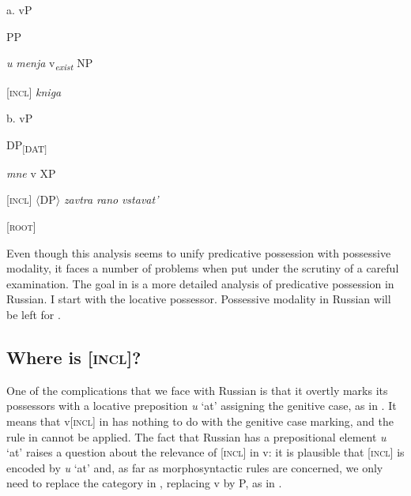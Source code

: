\documentclass[output=paper,colorlinks,citecolor=brown]{./langscibook}
\begin{document}
\ea%
    \label{ex:tsedryk:7}
    \gll\\
        \\
    \glt
    \z

          a.  vP    


  

    PP  

    \textit{u} \textit{menja}  v\textit{\textsubscript{exist}}   NP 

      [\textsc{incl}]  \textit{kniga}

  b.  vP    


  

    DP\textsubscript{[DAT]}  

    \textit{mne}  v    XP

      [\textsc{incl}]  ${\langle}$DP${\rangle}$ \textit{zavtra} \textit{rano} \textit{vstavat’}

      [\textsc{root}]  

Even though this analysis seems to unify predicative possession with possessive modality, it faces a number of problems when put under the scrutiny of a careful examination. The goal in  is a more detailed analysis of predicative possession in Russian. I start with the locative possessor. Possessive modality in Russian will be left for .

\subsection{Where is [\textsc{incl}]?}\label{sec:tsedryk:2.2}

One of the complications that we face with Russian is that it overtly marks its possessors with a locative preposition \textit{u} ‘at’ assigning the genitive case, as in . It means that v[\textsc{incl}] in  has nothing to do with the genitive case marking, and the rule in  cannot be applied. The fact that Russian has a prepositional element \textit{u} ‘at’ raises a question about the relevance of [\textsc{incl}] in v: it is plausible that [\textsc{incl}] is encoded by \textit{u} ‘at’ and, as far as morphosyntactic rules are concerned, we only need to replace the category in , replacing v by P, as in . 
\end{document}
